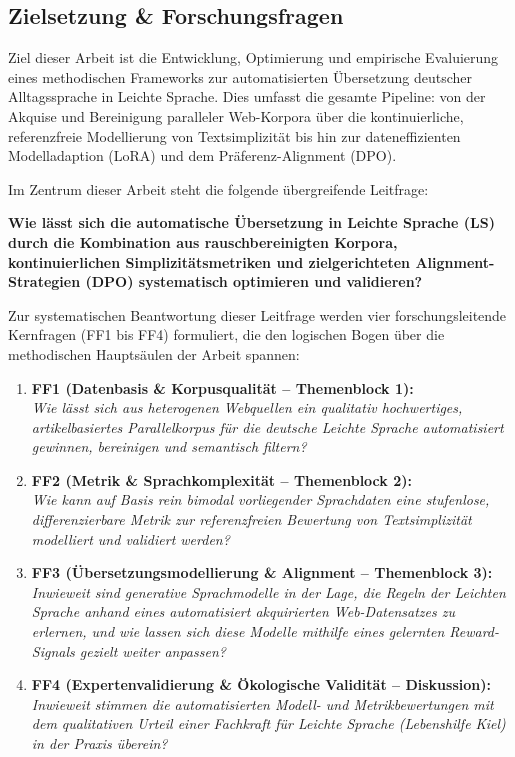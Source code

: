 \subsection{Zielsetzung \& Forschungsfragen}
\label{sec:zielsetzung_forschungsfragen}

Ziel dieser Arbeit ist die Entwicklung, Optimierung und empirische Evaluierung eines methodischen Frameworks zur automatisierten Übersetzung deutscher Alltagssprache in Leichte Sprache. Dies umfasst die gesamte Pipeline: von der Akquise und Bereinigung paralleler Web-Korpora über die kontinuierliche, referenzfreie Modellierung von Textsimplizität bis hin zur dateneffizienten Modelladaption (LoRA) und dem Präferenz-Alignment (DPO).

Im Zentrum dieser Arbeit steht die folgende übergreifende Leitfrage:

\begin{tcolorbox}[boxrule=0pt,sharp corners,enhanced,borderline west={2pt}{0pt}{blue}]
    \textbf{\large Wie lässt sich die automatische Übersetzung in Leichte Sprache (LS) durch die Kombination aus rauschbereinigten Korpora, kontinuierlichen Simplizitätsmetriken und zielgerichteten Alignment-Strategien (DPO) systematisch optimieren und validieren?}
\end{tcolorbox}

Zur systematischen Beantwortung dieser Leitfrage werden vier forschungsleitende Kernfragen (FF1 bis FF4) formuliert, die den logischen Bogen über die methodischen Hauptsäulen der Arbeit spannen:

\begin{enumerate}
    \item \textbf{FF1 (Datenbasis \& Korpusqualität -- Themenblock 1):}\\
    \textit{Wie lässt sich aus heterogenen Webquellen ein qualitativ hochwertiges, artikelbasiertes Parallelkorpus für die deutsche Leichte Sprache automatisiert gewinnen, bereinigen und semantisch filtern?}
    
    \item \textbf{FF2 (Metrik \& Sprachkomplexität -- Themenblock 2):}\\
    \textit{Wie kann auf Basis rein bimodal vorliegender Sprachdaten eine stufenlose, differenzierbare Metrik zur referenzfreien Bewertung von Textsimplizität modelliert und validiert werden?}

    \item \textbf{FF3 (Übersetzungsmodellierung \& Alignment -- Themenblock 3):}\\
    \textit{Inwieweit sind generative Sprachmodelle in der Lage, die Regeln der Leichten Sprache anhand eines automatisiert akquirierten Web-Datensatzes zu erlernen, und wie lassen sich diese Modelle mithilfe eines gelernten Reward-Signals gezielt weiter anpassen?}
    
    \item \textbf{FF4 (Expertenvalidierung \& Ökologische Validität -- Diskussion):}\\
    \textit{Inwieweit stimmen die automatisierten Modell- und Metrikbewertungen mit dem qualitativen Urteil einer Fachkraft für Leichte Sprache (Lebenshilfe Kiel) in der Praxis überein?}
\end{enumerate}

